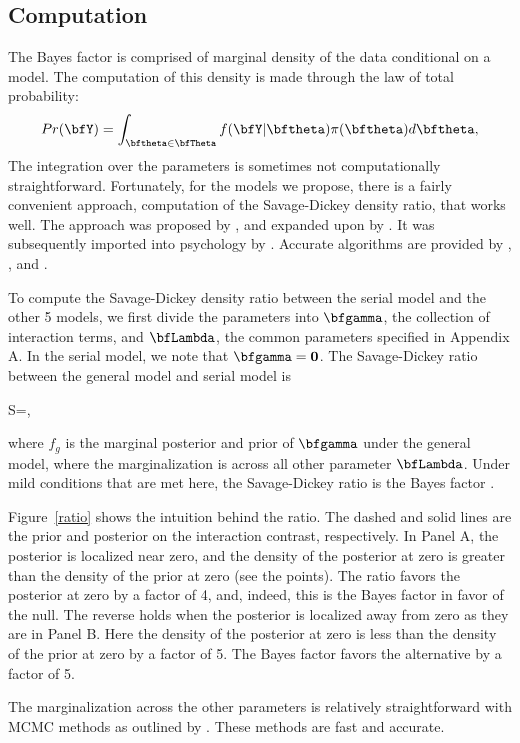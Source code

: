\documentclass[fignum,nobf,man]{apa}
\begin{document}
\subsection{Computation}
The Bayes factor is comprised of marginal density of the data
conditional on a model.  The computation of this density is made
through the law of total probability:
\[
Pr(\bfY) = \int_{\bftheta \in \bfTheta} f(\bfY|\bftheta)\pi(\bftheta)d\bftheta, 
\]
The integration over the parameters is sometimes not computationally
straightforward.  Fortunately, for the models we propose, there is a
fairly convenient approach, computation of the Savage-Dickey density
ratio, that works well.  The approach was proposed by \citet{Dickey:Lientz:1970}, and expanded upon
by \citet{Verdinelli:Wasserman:1995}.  It was subsequently imported
into psychology by \citet{Wagenmakers:etal:2010}.  Accurate
algorithms are provided by \citet{Chen:1994}, \citet{Gelfand:Smith:1990}, and \citet{Morey:etal:2011a}. 

To compute the Savage-Dickey density ratio between the serial model
and the other 5 models, we first divide the parameters into
$\bfgamma$, the collection of interaction terms, and $\bfLambda$, the
common parameters specified in Appendix A.  In the serial model, we note that
$\bfgamma=\bf0$.  The Savage-Dickey ratio between the general model
and serial model is
\begin{eqa}
S=,
\end{eqa}
where $f_g$ is the marginal posterior and prior of $\bfgamma$ under
the general model, where the marginalization is across all other
parameter $\bfLambda$.  Under mild conditions that are met here, the
Savage-Dickey ratio is the Bayes factor
\citep{Verdinelli:Wasserman:1995}.  

Figure~\ref{ratio} shows the intuition behind the ratio.  The dashed and solid lines are the prior and posterior on the interaction contrast, respectively.  In Panel A, the posterior is localized near
zero, and the density of the posterior at zero is greater than the density
of the prior at zero (see the points).  The ratio favors the posterior at zero by a factor of 4, and, indeed, this is the Bayes factor in favor of the null.  The reverse holds when the posterior is localized away
from zero as they are in Panel B.  Here the density of the posterior at zero is less than the density of the prior at zero by a factor of 5.  The Bayes factor favors the alternative by a factor of 5.

 The marginalization across the other parameters is relatively straightforward with MCMC methods as outlined by
\citet{Morey:etal:2011a}.  These methods are fast and accurate.
\end{document}
